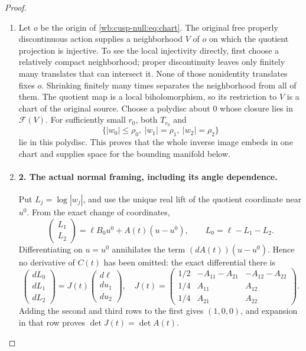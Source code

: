 \begin{proof}
\begin{enumerate}[label=\arabic*.,leftmargin=*]
\item Let \(o\) be the origin of \eqref{wb:cusp-null:eq:chart}. The original free properly
discontinuous action supplies a neighborhood \(V\) of \(o\) on which
the quotient projection is injective. To see the local injectivity
directly, first choose a relatively compact neighborhood; proper
discontinuity leaves only finitely many translates that can intersect it.
None of those nonidentity translates fixes \(o\). Shrinking finitely
many times separates the neighborhood from all of them. The quotient
map is a local biholomorphism, so its restriction to \(V\) is a chart
of the original source.
Choose a polydisc about \(0\) whose closure lies in \(\mathcal F(V)\).
For sufficiently small \(r_0\), both \(T_{r_0}\) and
\begin{equation}
 \{|w_0|\leq\rho_0,\ |w_1|=\rho_1,\ |w_2|=\rho_2\}
 \label{wb:cusp-null:eq:spatial-bound}
\end{equation}
lie in this polydisc. This proves that the whole inverse image embeds
in one chart and supplies space for the bounding manifold below.

\item \paragraph{2. The actual normal framing, including its angle dependence.}
Put \(L_j=\log|w_j|\), and use the unique real lift of the quotient
coordinate near \(u^0\). From the exact change of coordinates,
\begin{equation}
 \begin{pmatrix}L_1\\L_2\end{pmatrix}
 =\ell B_0u^0+A(t)(u-u^0),\qquad
 L_0=\ell-L_1-L_2.
 \label{wb:cusp-null:eq:nearby-moduli}
\end{equation}
Differentiating on \(u=u^0\) annihilates the term
\((dA(t))(u-u^0)\). Hence no derivative of \(C(t)\) has been omitted:
the exact differential there is
\begin{equation}
 \begin{pmatrix}dL_0\\dL_1\\dL_2\end{pmatrix}
 =J(t)\begin{pmatrix}d\ell\\du_1\\du_2\end{pmatrix},\quad
 J(t)=
 \begin{pmatrix}
 1/2&-A_{11}-A_{21}&-A_{12}-A_{22}\\
 1/4&A_{11}&A_{12}\\
 1/4&A_{21}&A_{22}
 \end{pmatrix}.
 \label{wb:cusp-null:eq:J}
\end{equation}
Adding the second and third rows to the first gives \((1,0,0)\),
and expansion in that row proves \(\det J(t)=\det A(t)\).


\end{enumerate}
\end{proof}

